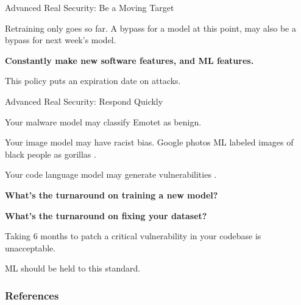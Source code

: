 \documentclass{beamer}
\begin{document}
\begin{frame}{Advanced Real Security: Be a Moving Target}
    \begin{center}
        Retraining only goes so far. A bypass for a model at this point, may also be a bypass for next week's model.
        \vspace{10pt}
        
        \textbf{Constantly make new software features, and ML features.}  
        \vspace{10pt}
        
        This policy puts an expiration date on attacks. \cite{proofpoint_cve}
    \end{center}
\end{frame}

\begin{frame}{Advanced Real Security: Respond Quickly}
    \begin{center}
        Your malware model may classify Emotet as benign.
        \vspace{10pt}
        
        Your image model may have racist bias. Google photos ML labeled images of black people as gorillas \cite{google_gorrilas}. 
        \vspace{10pt}

        Your code language model may generate vulnerabilities \cite{trojan-language-model}.
        \vspace{10pt}
        
        \textbf{What's the turnaround on training a new model?}  
        \vspace{10pt}

        \textbf{What's the turnaround on fixing your dataset?}
        \vspace{10pt}

        Taking 6 months to patch a critical vulnerability in your codebase is unacceptable.
        
        ML should be held to this standard.
    \end{center}
\end{frame}

\begin{frame}[t, allowframebreaks]
\frametitle{References}


\end{frame}
\end{document}
